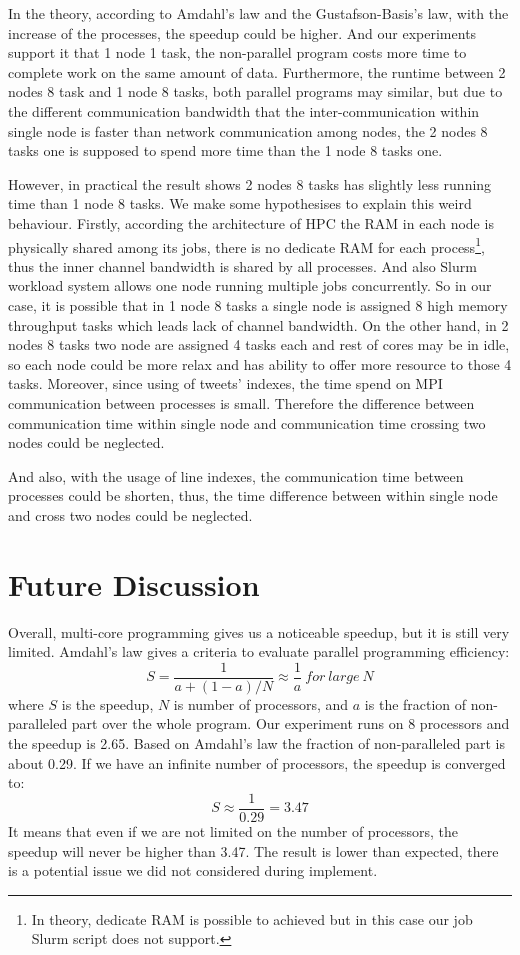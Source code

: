 \documentclass[11pt]{article}
\begin{document}
In the theory, according to Amdahl's law and the Gustafson-Basis’s law, with the increase of the processes, the speedup could be higher. And our experiments support it that 1 node 1 task, the non-parallel program costs more time to complete work on the same amount of data. Furthermore, the runtime between 2 nodes 8 task and 1 node 8 tasks, both parallel programs may similar, but due to the different communication bandwidth that the inter-communication within single node is faster than network communication among nodes, the 2 nodes 8 tasks one is supposed to spend more time than the 1 node 8 tasks one.

However, in practical the result shows 2 nodes 8 tasks has slightly less running time than 1 node 8 tasks. We make some hypothesises to explain this weird behaviour. Firstly, according the architecture of HPC the RAM in each node is physically shared among its jobs, there is no dedicate RAM for each process\footnote{In theory, dedicate RAM is possible to achieved but in this case our job Slurm script does not support.}, thus the inner channel bandwidth is shared by all processes. And also Slurm workload system allows one node running multiple jobs concurrently. So in our case, it is possible that in 1 node 8 tasks a single node is assigned 8 high memory throughput tasks which leads lack of channel bandwidth. On the other hand, in 2 nodes 8 tasks two node are assigned 4 tasks each and rest of cores may be in idle, so each node could be more relax and has ability to offer more resource to those 4 tasks. Moreover, since using of tweets' indexes, the time spend on MPI communication between processes is small. Therefore the difference between communication time within single node and communication time crossing two nodes could be neglected. 

And also, with the usage of line indexes, the communication time between processes could be shorten, thus, the time difference between within single node and cross two nodes could be neglected.

\section{Future Discussion}

Overall, multi-core programming gives us a noticeable speedup, but it is still very limited. Amdahl's law gives a criteria to  evaluate parallel programming efficiency: \[S=\frac{1}{a+(1-a)/N} \approx \frac{1}{a}\ for\ large\ N\] where $S$ is the speedup, $N$ is number of processors, and $a$ is the fraction of non-paralleled part over the whole program. Our experiment runs on 8 processors and the speedup is 2.65. Based on Amdahl's law the fraction of non-paralleled part is about 0.29. If we have an infinite number of processors, the speedup is converged to: \[S \approx \frac{1}{0.29} = 3.47\] It means that even if we are not limited on the number of processors, the speedup will never be higher than 3.47. The result is lower than expected, there is a potential issue we did not considered during implement.
\end{document}
